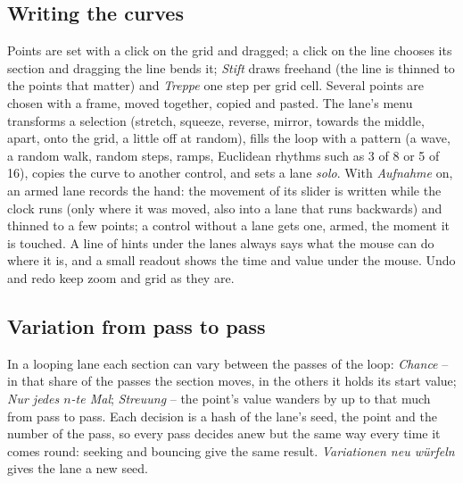 \documentclass[11pt,a4paper,parskip=half,DIV=11,toc=bibliography]{scrartcl}
\newcommand{\ui}[1]{\emph{#1}}                 %
\begin{document}
\subsection{Writing the curves}
Points are set with a click on the grid and dragged; a click on the line chooses its section and dragging the line bends it; \ui{Stift} draws freehand
(the line is thinned to the points that matter) and \ui{Treppe} one step per grid cell. Several points are chosen with a frame, moved together,
copied and pasted. The lane's menu transforms a selection (stretch, squeeze, reverse, mirror, towards the middle, apart, onto the grid, a little off at
random), fills the loop with a pattern (a wave, a random walk, random steps, ramps, Euclidean rhythms such as 3 of 8 or 5 of 16), copies the curve to
another control, and sets a lane \emph{solo}. With \ui{Aufnahme} on, an armed lane records the hand: the movement of its slider is written while the
clock runs (only where it was moved, also into a lane that runs backwards) and thinned to a few points; a control without a lane gets one, armed, the
moment it is touched. A line of hints under the lanes always says what the mouse can do where it is, and a small readout shows the time and value under
the mouse. Undo and redo keep zoom and grid as they are.

\subsection{Variation from pass to pass}
In a looping lane each section can vary between the passes of the loop: \ui{Chance} -- in that share of the passes the section moves, in the others it
holds its start value; \ui{Nur jedes $n$-te Mal}; \ui{Streuung} -- the point's value wanders by up to that much from pass to pass. Each decision is a
hash of the lane's seed, the point and the number of the pass, so every pass decides anew but the same way every time it comes round: seeking and
bouncing give the same result. \ui{Variationen neu würfeln} gives the lane a new seed.
\end{document}
